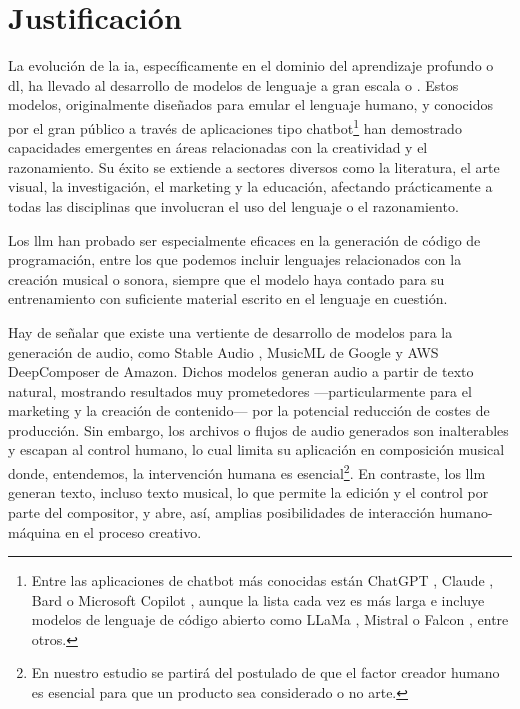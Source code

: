 \section{Justificación}



La evolución de la \gls{ia}, específicamente en el dominio del aprendizaje profundo o \gls{dl}, ha llevado al desarrollo de {modelos de lenguaje a gran escala} o . Estos modelos, originalmente diseñados para emular el lenguaje humano, y conocidos por el gran público a través de aplicaciones tipo {chatbot}\footnote{Entre las aplicaciones de {chatbot} más conocidas están {ChatGPT} \citep{IntroducingChatGPT}, {Claude} \citep{IntroducingClaude}, {Bard} \citep{BardChatbot2024} o {Microsoft Copilot} \citep{mehdiAnnouncingMicrosoftCopilot2023}, aunque la lista cada vez es más larga e incluye modelos de lenguaje de código abierto como {LLaMa} \citep{touvronLLaMAOpenEfficient2023}, {Mistral} \citep{jiangMistral7B2023} o {Falcon} \citep{almazroueiFalconSeriesOpen2023}, entre otros.} han demostrado capacidades emergentes en áreas relacionadas con la creatividad y el razonamiento. Su éxito se extiende a sectores diversos como la literatura, el arte visual, la investigación, el marketing y la educación, afectando prácticamente a todas las disciplinas que involucran el uso del lenguaje o el razonamiento.

Los \gls{llm} han probado ser especialmente eficaces en la generación de código de programación, entre los que podemos incluir lenguajes relacionados con la creación musical o sonora, siempre que el modelo haya contado para su entrenamiento con suficiente material escrito en el lenguaje en cuestión.

Hay de señalar que existe una vertiente de desarrollo de modelos para la generación de audio, como {Stable Audio} \citep{Audio}, {MusicML} \citep{MusicLM} de Google y {AWS DeepComposer} \citep{AWSDeepComposer} de Amazon. Dichos modelos generan audio a partir de texto natural, mostrando resultados muy prometedores ---particularmente para el marketing y la creación de contenido--- por la potencial reducción de costes de producción. Sin embargo, los archivos o flujos de audio generados son inalterables y escapan al control humano, lo cual limita su aplicación en composición musical donde, entendemos, la intervención humana es esencial\footnote{En nuestro estudio se partirá del postulado de que el factor creador humano es esencial para que un producto sea considerado o no arte.}. En contraste, los \gls{llm} generan texto, incluso texto musical, lo que permite la edición y el control por parte del compositor, y abre, así, amplias posibilidades de interacción humano-máquina en el proceso creativo.

